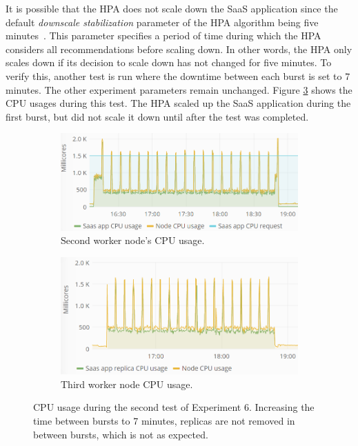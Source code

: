 It is possible that the HPA does not scale down the SaaS application since the default \textit{downscale stabilization} parameter of the HPA algorithm being five minutes~\citep{HPA}. This parameter specifies a period of time during which the HPA considers all recommendations before scaling down. In other words, the HPA only scales down if its decision to scale down has not changed for five minutes.
To verify this, another test is run where the downtime between each burst is set to 7 minutes. The other experiment parameters remain unchanged. Figure \ref{fig:cpu-saas-hpa-bursty-2} shows the CPU usages during this test. The HPA scaled up the SaaS application during the first burst, but did not scale it down until after the test was completed. 

\begin{figure}
\centering
\begin{subfigure}[b]{\columnwidth}
\centering
\includegraphics[width=0.70\columnwidth]{Images/Experiments/CPU/Grafana/cpu-saas-hpa-bursty-3-1.PNG}
\caption{Second worker node's CPU usage.}
\label{fig:cpu-saas-hpa-bursty-3-1}
\end{subfigure}
\hfill
\begin{subfigure}[b]{\columnwidth}
\centering
\includegraphics[width=0.70\columnwidth]{Images/Experiments/CPU/Grafana/cpu-saas-hpa-bursty-3-2.PNG}
\caption{Third worker node CPU usage.}
\label{fig:cpu-saas-hpa-bursty-3-2}
\end{subfigure}
\hfill
\vspace*{-7mm}
\caption{CPU usage during the second test of Experiment 6. Increasing the time between bursts to 7 minutes, replicas are not removed in between bursts, which is not as expected.}
\label{fig:cpu-saas-hpa-bursty-2}
\end{figure}

